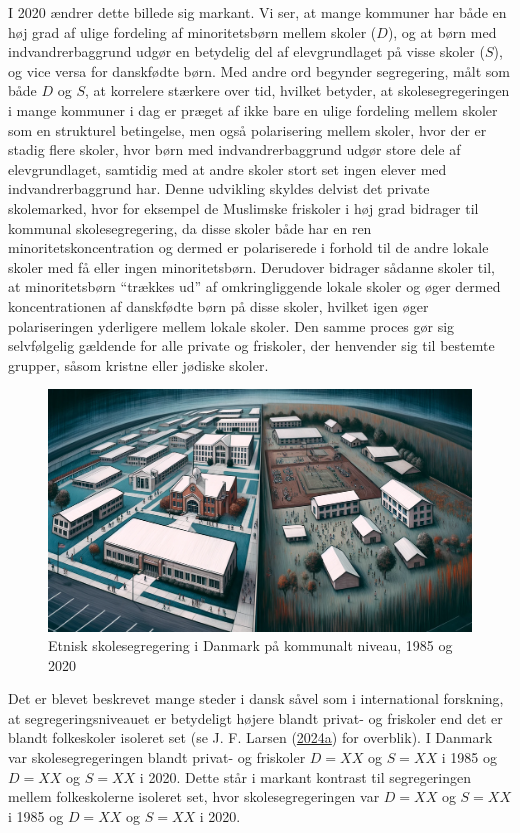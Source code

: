 \documentclass[
]{book}
\begin{document}
I 2020 ændrer dette billede sig markant. Vi ser, at mange kommuner har både en høj grad af ulige fordeling af minoritetsbørn mellem skoler (\(D\)), og at børn med indvandrerbaggrund udgør en betydelig del af elevgrundlaget på visse skoler (\(S\)), og vice versa for danskfødte børn. Med andre ord begynder segregering, målt som både \(D\) og \(S\), at korrelere stærkere over tid, hvilket betyder, at skolesegregeringen i mange kommuner i dag er præget af ikke bare en ulige fordeling mellem skoler som en strukturel betingelse, men også polarisering mellem skoler, hvor der er stadig flere skoler, hvor børn med indvandrerbaggrund udgør store dele af elevgrundlaget, samtidig med at andre skoler stort set ingen elever med indvandrerbaggrund har. Denne udvikling skyldes delvist det private skolemarked, hvor for eksempel de Muslimske friskoler i høj grad bidrager til kommunal skolesegregering, da disse skoler både har en ren minoritetskoncentration og dermed er polariserede i forhold til de andre lokale skoler med få eller ingen minoritetsbørn. Derudover bidrager sådanne skoler til, at minoritetsbørn ``trækkes ud'' af omkringliggende lokale skoler og øger dermed koncentrationen af danskfødte børn på disse skoler, hvilket igen øger polariseringen yderligere mellem lokale skoler. Den samme proces gør sig selvfølgelig gældende for alle private og friskoler, der henvender sig til bestemte grupper, såsom kristne eller jødiske skoler.

\begin{figure}
\includegraphics[width=24.89in]{images/dalle-schoolseg} \caption{Etnisk skolesegregering i Danmark på kommunalt niveau, 1985 og 2020}\label{fig:fig-3-3}
\end{figure}

Det er blevet beskrevet mange steder i dansk såvel som i international forskning, at segregeringsniveauet er betydeligt højere blandt privat- og friskoler end det er blandt folkeskoler isoleret set (se J. F. Larsen (\protect\hyperlink{ref-larsen2024a}{2024a}) for overblik). I Danmark var skolesegregeringen blandt privat- og friskoler \(D=XX\) og \(S=XX\) i 1985 og \(D=XX\) og \(S=XX\) i 2020. Dette står i markant kontrast til segregeringen mellem folkeskolerne isoleret set, hvor skolesegregeringen var \(D=XX\) og \(S=XX\) i 1985 og \(D=XX\) og \(S=XX\) i 2020.
\end{document}
